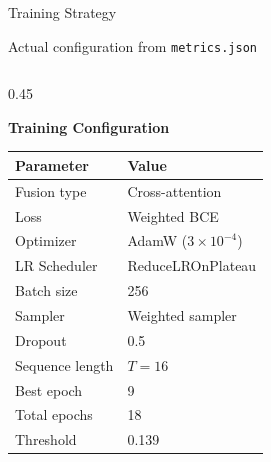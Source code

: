\documentclass[aspectratio=169, 10pt]{beamer}
\begin{document}
\begin{frame}{Training Strategy}

\textcolor{NavyBlue}{\footnotesize
Actual configuration from \texttt{metrics.json}}

\vspace{2pt}

\small

\begin{columns}[T,onlytextwidth]

\begin{column}{0.45\textwidth}

\textcolor{NavyBlue}{\small\bfseries Training Configuration}

\vspace{2pt}

\scriptsize

\begin{tabular}{@{}p{2.3cm}p{3.5cm}@{}}

\toprule

\rowcolor{NavyBlue}
\color{white}\bfseries Parameter &
\color{white}\bfseries Value \\

\midrule

\rowcolor{CardBlue}
Fusion type & Cross-attention \\

Loss & Weighted BCE \\

\rowcolor{CardBlue}
Optimizer & AdamW ($3\times10^{-4}$) \\

LR Scheduler & ReduceLROnPlateau \\

\rowcolor{CardBlue}
Batch size & 256 \\

Sampler & Weighted sampler \\

\rowcolor{CardBlue}
Dropout & 0.5 \\

Sequence length & $T=16$ \\

\rowcolor{CardBlue}
Best epoch & 9 \\

Total epochs & 18 \\

\rowcolor{CardBlue}
Threshold & 0.139 \\


\end{tabular}
\end{column}
\end{columns}
\end{frame}
\end{document}
